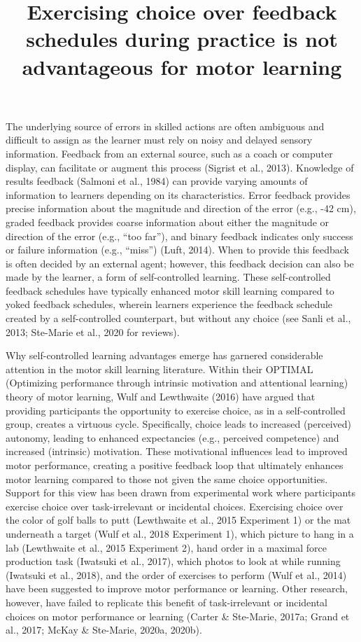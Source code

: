 \documentclass[
  man, donotrepeattitle,floatsintext]{apa7}
\title{Exercising choice over feedback schedules during practice is not advantageous for motor learning}
\author{\phantom{0}}
\date{}
\affiliation{\phantom{0}}
\begin{document}
\maketitle

The underlying source of errors in skilled actions are often ambiguous and difficult to assign as the learner must rely on noisy and delayed sensory information. Feedback from an external source, such as a coach or computer display, can facilitate or augment this process (Sigrist et al., 2013). Knowledge of results feedback (Salmoni et al., 1984) can provide varying amounts of information to learners depending on its characteristics. Error feedback provides precise information about the magnitude and direction of the error (e.g., -42 cm), graded feedback provides coarse information about either the magnitude or direction of the error (e.g., ``too far''), and binary feedback indicates only success or failure information (e.g., ``miss'') (Luft, 2014). When to provide this feedback is often decided by an external agent; however, this feedback decision can also be made by the learner, a form of self-controlled learning. These self-controlled feedback schedules have typically enhanced motor skill learning compared to yoked feedback schedules, wherein learners experience the feedback schedule created by a self-controlled counterpart, but without any choice (see Sanli et al., 2013; Ste-Marie et al., 2020 for reviews).

Why self-controlled learning advantages emerge has garnered considerable attention in the motor skill learning literature. Within their OPTIMAL (Optimizing performance through intrinsic motivation and attentional learning) theory of motor learning, Wulf and Lewthwaite (2016) have argued that providing participants the opportunity to exercise choice, as in a self-controlled group, creates a virtuous cycle. Specifically, choice leads to increased (perceived) autonomy, leading to enhanced expectancies (e.g., perceived competence) and increased (intrinsic) motivation. These motivational influences lead to improved motor performance, creating a positive feedback loop that ultimately enhances motor learning compared to those not given the same choice opportunities. Support for this view has been drawn from experimental work where participants exercise choice over task-irrelevant or incidental choices. Exercising choice over the color of golf balls to putt (Lewthwaite et al., 2015 Experiment 1) or the mat underneath a target (Wulf et al., 2018 Experiment 1), which picture to hang in a lab (Lewthwaite et al., 2015 Experiment 2), hand order in a maximal force production task (Iwatsuki et al., 2017), which photos to look at while running (Iwatsuki et al., 2018), and the order of exercises to perform (Wulf et al., 2014) have been suggested to improve motor performance or learning. Other research, however, have failed to replicate this benefit of task-irrelevant or incidental choices on motor performance or learning (Carter \& Ste-Marie, 2017a; Grand et al., 2017; McKay \& Ste-Marie, 2020a, 2020b).
\end{document}
